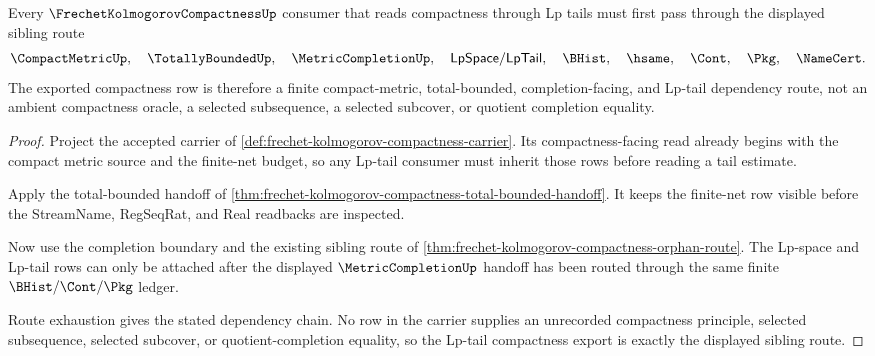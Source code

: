 \begin{theorem}
\label{thm:frechet-kolmogorov-compactness-lp-tail-route}
Every $\FrechetKolmogorovCompactnessUp$ consumer that reads compactness through Lp tails must first pass through the displayed sibling route
$$
\CompactMetricUp,\quad
\TotallyBoundedUp,\quad
\MetricCompletionUp,\quad
\mathsf{LpSpace}/\mathsf{LpTail},\quad
\BHist,\quad
\hsame,\quad
\Cont,\quad
\Pkg,\quad
\NameCert .
$$
The exported compactness row is therefore a finite compact-metric, total-bounded, completion-facing, and Lp-tail dependency route, not an ambient compactness oracle, a selected subsequence, a selected subcover, or quotient completion equality.
\end{theorem}
\begin{proof}
Project the accepted carrier of \autoref{def:frechet-kolmogorov-compactness-carrier}. Its compactness-facing read already begins with the compact metric source and the finite-net budget, so any Lp-tail consumer must inherit those rows before reading a tail estimate.

Apply the total-bounded handoff of \autoref{thm:frechet-kolmogorov-compactness-total-bounded-handoff}. It keeps the finite-net row visible before the StreamName, RegSeqRat, and Real readbacks are inspected.

Now use the completion boundary and the existing sibling route of \autoref{thm:frechet-kolmogorov-compactness-orphan-route}. The Lp-space and Lp-tail rows can only be attached after the displayed $\MetricCompletionUp$ handoff has been routed through the same finite $\BHist/\Cont/\Pkg$ ledger.

Route exhaustion gives the stated dependency chain. No row in the carrier supplies an unrecorded compactness principle, selected subsequence, selected subcover, or quotient-completion equality, so the Lp-tail compactness export is exactly the displayed sibling route.
\end{proof}
